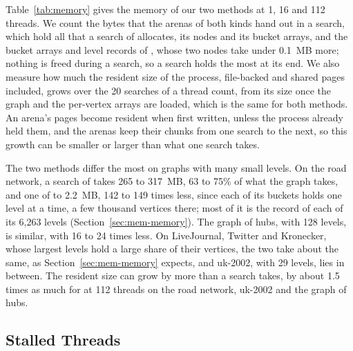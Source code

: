 Table~\ref{tab:memory} gives the memory of our two methods at 1, 16 and 112 threads. We count the bytes that the arenas of both kinds hand out in a search, which hold all that a search of \wfdo allocates, its nodes and its bucket arrays, and the bucket arrays and level records of \wfdomem, whose two nodes take under 0.1~MB more; nothing is freed during a search, so a search holds the most at its end. We also measure how much the resident size of the process, file-backed and shared pages included, grows over the 20 searches of a thread count, from its size once the graph and the per-vertex arrays are loaded, which is the same for both methods. An arena's pages become resident when first written, unless the process already held them, and the arenas keep their chunks from one search to the next, so this growth can be smaller or larger than what one search takes.

The two methods differ the most on graphs with many small levels. On the road network, a search of \wfdo takes 265 to 317~MB, 63 to 75\% of what the graph takes, and one of  to 2.2~MB, 142 to 149 times less, since each of its buckets holds one level at a time, a few thousand vertices there; most of it is the record of each of its 6,263 levels (Section~\ref{sec:mem-memory}). The graph of hubs, with 128 levels, is similar, with 16 to 24 times less. On LiveJournal, Twitter and Kronecker, whose largest levels hold a large share of their vertices, the two take about the same, as Section~\ref{sec:mem-memory} expects, and uk-2002, with 29 levels, lies in between. The resident size can grow by more than a search takes, by about 1.5 times as much for \wfdo at 112 threads on the road network, uk-2002 and the graph of hubs.

\subsection{Stalled Threads}
\label{sec:exp-stalls}

